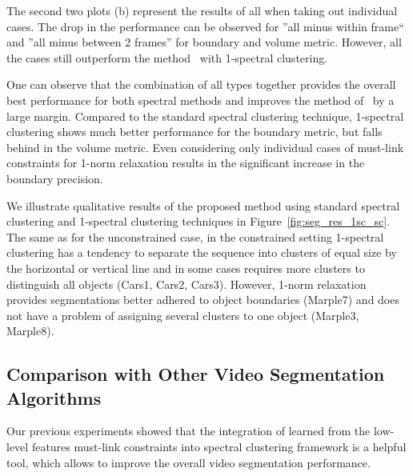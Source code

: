 The second two plots (b) represent the results of all when taking out individual cases.
The drop in the performance can be observed for ''all minus within frame`` and ''all minus between 2 frames'' for boundary and volume metric. 
However, all the cases still outperform the method~\cite{GalassoCS12} with 1-spectral clustering. 

One can observe that the combination of all types together provides the overall best performance for both spectral methods and improves the method of~\cite{GalassoCS12} by a large margin.
Compared to the standard spectral clustering technique, 1-spectral clustering shows much better performance for the boundary metric, but falls behind in the volume metric.
Even considering only individual cases of must-link constraints for 1-norm relaxation results in the significant increase in the boundary precision.

We illustrate qualitative results of the proposed method using standard spectral clustering and 1-spectral clustering techniques in Figure~\ref{fig:seg_res_1sc_sc}.
The same as for the unconstrained case, in the constrained setting 1-spectral clustering has a tendency to separate the sequence into clusters of equal size by the horizontal or vertical line and in some cases 
requires more clusters to distinguish all objects (Cars1, Cars2, Cars3). However, 1-norm relaxation provides segmentations better adhered to object boundaries (Marple7) 
and does not have a problem of assigning several clusters to one object (Marple3, Marple8).
\subsection{Comparison with Other Video Segmentation Algorithms}
Our previous experiments showed that the integration of learned from the low-level features must-link constraints into spectral clustering framework is a helpful tool, 
which allows to improve the overall video segmentation performance.


